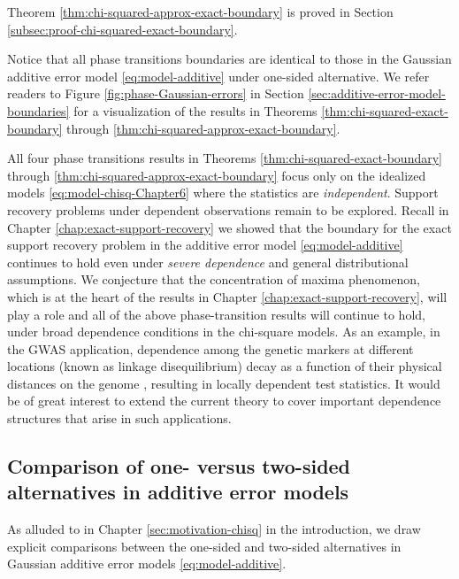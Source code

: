 Theorem \ref{thm:chi-squared-approx-exact-boundary} is proved in Section \ref{subsec:proof-chi-squared-exact-boundary}. 

Notice that all phase transitions boundaries are identical to those in the Gaussian additive error model \eqref{eq:model-additive} under one-sided alternative.
We refer readers to Figure \ref{fig:phase-Gaussian-errors} in Section \ref{sec:additive-error-model-boundaries} for a visualization of the results in Theorems \ref{thm:chi-squared-exact-boundary} through \ref{thm:chi-squared-approx-exact-boundary}.

\medskip

All four phase transitions results in Theorems \ref{thm:chi-squared-exact-boundary} through \ref{thm:chi-squared-approx-exact-boundary} 
focus only on the idealized models \eqref{eq:model-chisq-Chapter6} where the statistics are \emph{independent}.
Support recovery problems under dependent observations remain to be explored.
Recall in Chapter \ref{chap:exact-support-recovery} we showed that the boundary for the exact support recovery problem in the additive error model 
\eqref{eq:model-additive} continues to hold even under {\em severe dependence} and general distributional assumptions.
We conjecture that the concentration of maxima phenomenon, which is at the heart of the results in Chapter \ref{chap:exact-support-recovery}, will play
a role and all of the above phase-transition results will continue to hold, under broad dependence conditions in the chi-square models. As an example, 
in the GWAS application, dependence among the genetic markers at different locations (known as linkage disequilibrium) decay as a function of their physical distances on the genome \citep{bush2012genome}, resulting in locally dependent test statistics.
It would be of great interest to extend the current theory to cover important dependence structures that arise in such applications.


\subsection{Comparison of one- versus two-sided alternatives in additive error models}
\label{subsec:one-vs-two-sided}


As alluded to in Chapter \ref{sec:motivation-chisq} in the introduction, we draw explicit comparisons between the one-sided and two-sided alternatives in Gaussian additive error models \eqref{eq:model-additive}.


